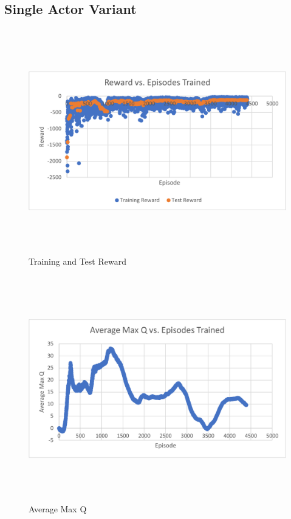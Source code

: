 \subsection{Single Actor Variant}
\begin{figure}[H]
	\includegraphics[width=6in, height=3.85in, keepaspectratio]{figures/train_figs/all_r.pdf}
	\caption{Training and Test Reward} \label{fig:all_r}
\end{figure}

\begin{figure}[H]
	\includegraphics[width=6in, height=3.85in, keepaspectratio]{figures/train_figs/all_q.pdf}
	\caption{Average Max Q} \label{fig:all_q}
\end{figure}

